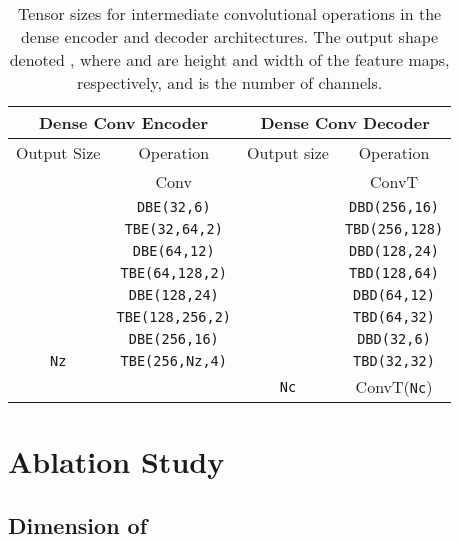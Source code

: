 \documentclass[runningheads]{llncs}
\begin{document}
\begin{table}[ht!]
  \centering
  \begin{tabular}{|c|c|c|c|}
    \hline
    \multicolumn{2}{|c|}{Dense Conv Encoder} & \multicolumn{2}{c|}{Dense Conv Decoder} \\
    \hline
    Output Size & Operation & Output size & Operation \\
    \hline
    \hline
     &  Conv &  &  ConvT \\
    \hline
     & \texttt{DBE(32,6)} &  & \texttt{DBD(256,16)}\\
    \hline
     & \texttt{TBE(32,64,2)} &  &  \texttt{TBD(256,128)} \\
    \hline
     & \texttt{DBE(64,12)} &  & \texttt{DBD(128,24)} \\
    \hline
     & \texttt{TBE(64,128,2)} &  & \texttt{TBD(128,64)} \\
    \hline
     & \texttt{DBE(128,24)} &  & \texttt{DBD(64,12)} \\
    \hline    
     & \texttt{TBE(128,256,2)} &  & \texttt{TBD(64,32)} \\
    \hline    
     & \texttt{DBE(256,16)} &  & \texttt{DBD(32,6)} \\
    \hline    
    \texttt{Nz}             & \texttt{TBE(256,\texttt{Nz},4)} &  & \texttt{TBD(32,32)} \\
    \hline    
                          &                                & \texttt{Nc} &  ConvT(\texttt{Nc}) \\
    \hline         
  \end{tabular}
  \caption{Tensor sizes for intermediate convolutional operations in the dense encoder and decoder architectures.
  The output shape denoted , where  and  are height and width of the feature maps, respectively, 
  and  is the number of channels.}
  \label{tab:dense_architectures}
\end{table}











\section{Ablation Study}
\label{append:ablation}
\subsection{Dimension of }
\end{document}
